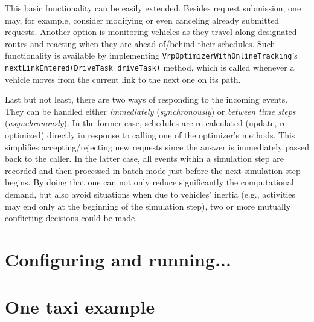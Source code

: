 This basic functionality can be easily extended. Besides request submission, one may, for example, consider modifying or even canceling already submitted requests. Another option is monitoring vehicles as they travel along designated routes and reacting when they are ahead of/behind their schedules. Such functionality is available by implementing \lstinline$VrpOptimizerWithOnlineTracking$'s \lstinline$nextLinkEntered(DriveTask driveTask)$ method, which is called whenever a vehicle moves from the current link to the next one on its path.

Last but not least, there are two ways of responding to the incoming events. They can be handled either \emph{immediately} (\emph{synchronously}) or \emph{between time steps} (\emph{asynchronously}). In the former case, schedules are re-calculated (update, re-optimized) directly in response to calling one of the optimizer's methods. This simplifies accepting/rejecting new requests since the answer is immediately passed back to the caller. In the latter case, all events within a simulation step are recorded and then processed in batch mode just before the next simulation step begins. By doing that one can not only reduce significantly the computational demand, but also avoid situations when due to vehicles' inertia (e.g., activities may end only at the beginning of the simulation step), two or more mutually conflicting decisions could be made.


\section{Configuring and running...}


\section{One taxi example}

